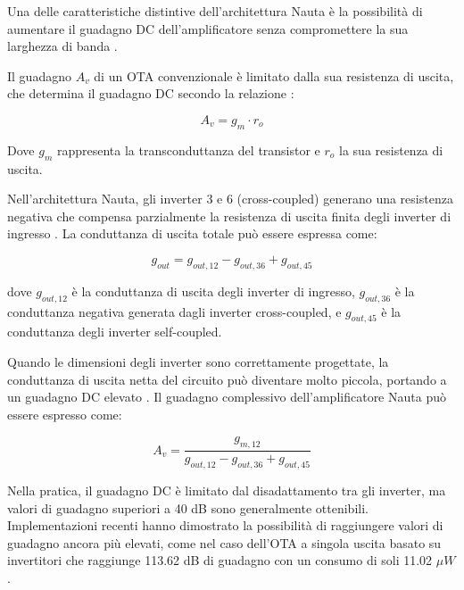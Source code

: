 Una delle caratteristiche distintive dell'architettura Nauta è la possibilità di aumentare il guadagno DC dell'amplificatore senza compromettere la sua larghezza di banda \cite{EMI_Immunity_of_the_Nauta_Inverter-Based_Amplifier}.

Il guadagno $A_v$ di un OTA convenzionale è limitato dalla sua resistenza di uscita, che determina il guadagno DC secondo la relazione \cite{tesi}:

\begin{equation}
A_v = g_m \cdot r_o
\end{equation}

Dove $g_m$ rappresenta la transconduttanza del transistor e $r_o$ la sua resistenza di uscita.

Nell'architettura Nauta, gli inverter 3 e 6 (cross-coupled) generano una resistenza negativa che compensa parzialmente la resistenza di uscita finita degli inverter di ingresso \cite{EMI_Immunity_of_the_Nauta_Inverter-Based_Amplifier}. La conduttanza di uscita totale può essere espressa come:

\begin{equation}
g_{out} = g_{out,12} - g_{out,36} + g_{out,45}
\end{equation}

dove $g_{out,12}$ è la conduttanza di uscita degli inverter di ingresso, $g_{out,36}$ è la conduttanza negativa generata dagli inverter cross-coupled, e $g_{out,45}$ è la conduttanza degli inverter self-coupled.

Quando le dimensioni degli inverter sono correttamente progettate, la conduttanza di uscita netta del circuito può diventare molto piccola, portando a un guadagno DC elevato \cite{EMI_Immunity_of_the_Nauta_Inverter-Based_Amplifier}. Il guadagno complessivo dell'amplificatore Nauta può essere espresso come:

\begin{equation}
A_v = \frac{g_{m,12}}{g_{out,12} - g_{out,36} + g_{out,45}}
\end{equation}

Nella pratica, il guadagno DC è limitato dal disadattamento tra gli inverter, ma valori di guadagno superiori a 40 dB sono generalmente ottenibili. Implementazioni recenti hanno dimostrato la possibilità di raggiungere valori di guadagno ancora più elevati, come nel caso dell'OTA a singola uscita basato su invertitori che raggiunge 113.62 dB di guadagno con un consumo di soli 11.02 $\mu W$ \cite{EMI_Immunity_of_the_Nauta_Inverter-Based_Amplifier}.

